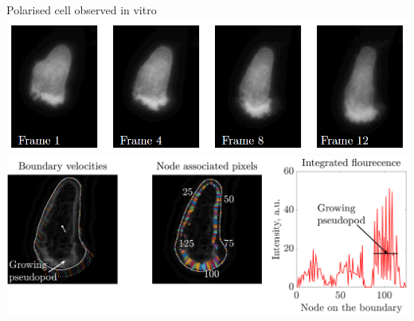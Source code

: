 \documentclass[mathserif,11pt]{beamer}
\begin{document}
\begin{frame}{Polarised cell observed in vitro}
\centering
\includegraphics[scale=0.4]{Figures/in_vitro_cell.png}
\vfil
\includegraphics[scale=0.2]{Figures/normally_polarised_t9.png}
\end{frame}
\end{document}

